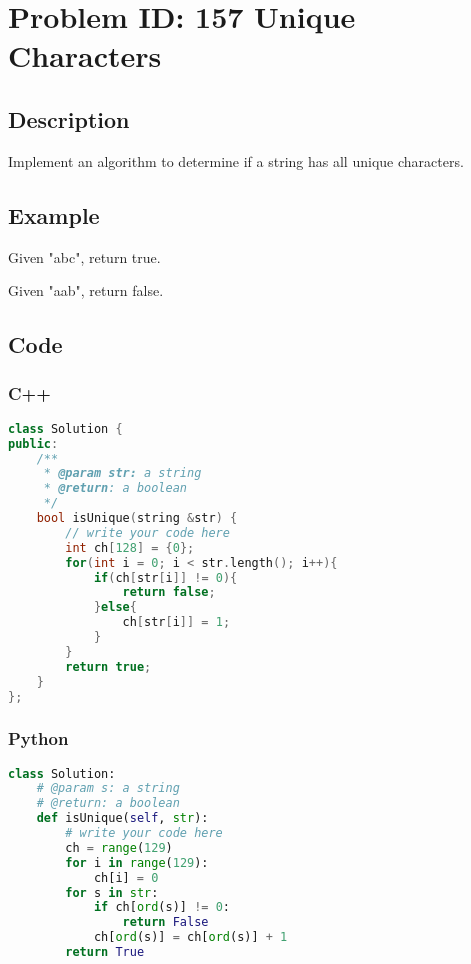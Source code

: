 \section{Problem ID: 157 Unique Characters}
\subsection{Description}
Implement an algorithm to determine if a string has all unique characters.

\subsection{Example}
Given "abc", return true.

Given "aab", return false.

\subsection{Code}
\scriptsize
\subsubsection{C++}
\begin{lstlisting}[language=C++]
class Solution {
public:
    /**
     * @param str: a string
     * @return: a boolean
     */
    bool isUnique(string &str) {
        // write your code here
        int ch[128] = {0};
        for(int i = 0; i < str.length(); i++){
            if(ch[str[i]] != 0){
                return false;
            }else{
                ch[str[i]] = 1;
            }
        }
        return true;
    }
};
\end{lstlisting}

\subsubsection{Python}
\begin{lstlisting}[language=Python]
class Solution:
    # @param s: a string
    # @return: a boolean
    def isUnique(self, str):
        # write your code here
        ch = range(129)
        for i in range(129):
            ch[i] = 0
        for s in str:
            if ch[ord(s)] != 0:
                return False
            ch[ord(s)] = ch[ord(s)] + 1
        return True
\end{lstlisting}
\normalsize 